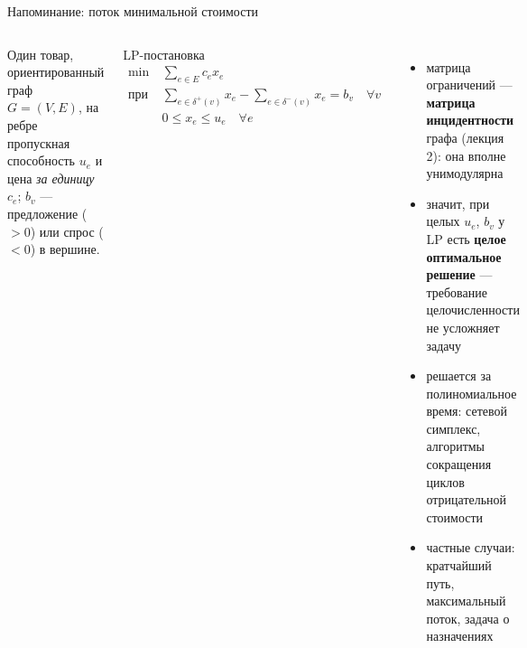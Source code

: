 \documentclass[aspectratio=169,10pt]{beamer}
\begin{document}
\begin{frame}{Напоминание: поток минимальной стоимости}
\begin{columns}[T]
Один товар, ориентированный граф $G=(V,E)$, на ребре пропускная способность $u_e$ и цена \emph{за единицу} $c_e$; $b_v$ --- предложение ($>0$) или спрос ($<0$) в вершине.
\begin{block}{LP-постановка}
\vspace{-6pt}
\begin{align*}
\min\ & \sum_{e\in E} c_e x_e\\
\text{при}\ & \sum_{e\in\delta^+(v)}x_e-\sum_{e\in\delta^-(v)}x_e=b_v\quad\forall v\\
& 0\le x_e\le u_e\quad\forall e
\end{align*}
\end{block}
\begin{itemize}\setlength{\itemsep}{4pt}
\item матрица ограничений --- \textbf{матрица инцидентности} графа (лекция 2): она вполне унимодулярна
\item значит, при целых $u_e$, $b_v$ у LP есть \textbf{целое оптимальное решение} --- требование целочисленности не усложняет задачу
\item решается за полиномиальное время: сетевой симплекс, алгоритмы сокращения циклов отрицательной стоимости
\item частные случаи: кратчайший путь, максимальный поток, задача о назначениях
\end{itemize}
\end{columns}
\end{frame}
\end{document}
